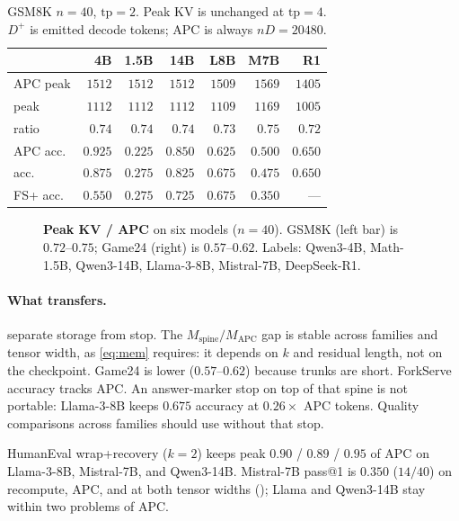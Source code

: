 \begin{table}[t]
\centering
\caption{GSM8K $n{=}40$, $\mathrm{tp}{=}2$.
Peak KV is unchanged at $\mathrm{tp}{=}4$.
$D^{+}$ is emitted decode tokens; APC is always $nD{=}20480$.}
\label{tab:multi}
\scriptsize
\setlength{\tabcolsep}{2.5pt}
\begin{tabular}{lrrrrrr}
\toprule
 & 4B & 1.5B & 14B & L8B & M7B & R1 \\
\midrule
APC peak & $1512$ & $1512$ & $1512$ & $1509$ & $1569$ & $1405$ \\
\sys{} peak & $1112$ & $1112$ & $1112$ & $1109$ & $1169$ & $1005$ \\
ratio & $0.74$ & $0.74$ & $0.74$ & $0.73$ & $0.75$ & $0.72$ \\
APC acc. & $0.925$ & $0.225$ & $0.850$ & $0.625$ & $0.500$ & $0.650$ \\
\sys{} acc. & $0.875$ & $0.275$ & $0.825$ & $0.675$ & $0.475$ & $0.650$ \\
FS+ acc. & $0.550$ & $0.275$ & $0.725$ & $0.675$ & $0.350$ & --- \\
\bottomrule
\end{tabular}
\end{table}

\begin{figure}[t]
\centering
\resizebox{\columnwidth}{!}{}
\caption{\textbf{Peak KV / APC} on six models ($n{=}40$).
GSM8K (left bar) is $0.72$--$0.75$; Game24 (right) is $0.57$--$0.62$.
Labels: Qwen3-4B, Math-1.5B, Qwen3-14B, Llama-3-8B, Mistral-7B, DeepSeek-R1.}
\label{fig:eval-multi}
\end{figure}

\paragraph{What transfers.}
 separate storage from stop.
The $M_{\mathrm{spine}}/M_{\mathrm{APC}}$ gap is stable across families and tensor width, as \eqref{eq:mem} requires: it depends on $k$ and residual length, not on the checkpoint.
Game24 is lower ($0.57$--$0.62$) because trunks are short.
ForkServe accuracy tracks APC.
An answer-marker stop on top of that spine is not portable: Llama-3-8B keeps $0.675$ accuracy at $0.26\times$ APC tokens.
Quality comparisons across families should use \sys without that stop.

HumanEval wrap+recovery ($k{=}2$) keeps peak $0.90$ / $0.89$ / $0.95$ of APC on Llama-3-8B, Mistral-7B, and Qwen3-14B.
Mistral-7B pass@1 is $0.350$ ($14/40$) on recompute, APC, and \sys at both tensor widths (); Llama and Qwen3-14B stay within two problems of APC.

